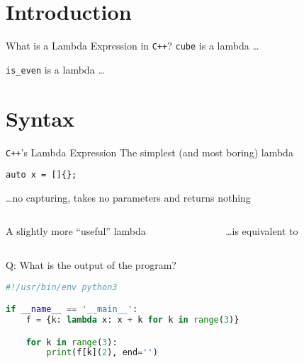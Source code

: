 \begin{frame}
    \centering
    \scalebox{3}{Introduction}
\end{frame}

\section{Introduction}

\begin{frame}[fragile]{What is a Lambda Expression in \texttt{C++}?}
    \texttt{cube} is a lambda \ldots

    \texttt{is\_even} is a lambda \ldots
\end{frame}

\begin{frame}
    \centering
    \scalebox{3}{Syntax}
\end{frame}

\section{Syntax}

\begin{frame}[fragile]{\texttt{C++}'s Lambda Expression}
    The simplest (and most boring) lambda
    \begin{lstlisting}
auto x = []{};
    \end{lstlisting}
    \hfill \ldots no capturing, takes no parameters and returns nothing

    \vspace{5mm}

    \begin{columns}[t]
        \begin{column}{.45\textwidth}
            A slightly more \enquote{useful} lambda
        \end{column}
        \begin{column}{.45\textwidth}
            \ldots is equivalent to
        \end{column}
    \end{columns}
\end{frame}

\begin{frame}[fragile]{Q: What is the output of the program?}
    \begin{lstlisting}[language=python]
#!/usr/bin/env python3

if __name__ == '__main__':
    f = {k: lambda x: x + k for k in range(3)}

    for k in range(3):
        print(f[k](2), end='')
    \end{lstlisting}
\end{frame}

